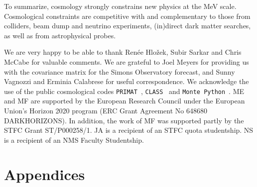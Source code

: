 \documentclass[notitlepage,letterpaper,natbib,aps,prd,onecolumn,amsmath,amsfonts,nofootinbib,preprintnumbers,superscriptaddress,secnumarabic,groupedaddress]{revtex4-1}
\begin{document}
To summarize, cosmology strongly constrains new physics at the MeV scale. Cosmological constraints are competitive with and complementary to those from  colliders, beam dump and neutrino experiments, (in)direct dark matter searches, as well as from astrophysical probes. 

















\begin{acknowledgements}
We are very happy to be able to thank Ren\'ee Hlo\v{z}ek, Subir Sarkar and Chris McCabe for valuable comments. We are grateful to Joel Meyers for providing us with the covariance matrix for the Simons Observatory forecast, and Sunny Vagnozzi and Erminia Calabrese for useful correspondence. We acknowledge the use of the public cosmological codes \texttt{PRIMAT}~\cite{Pitrou:2018cgg}, \texttt{CLASS}~\cite{Blas:2011rf,Lesgourgues:2011re} and \texttt{Monte Python}~\cite{Audren:2012wb,Brinckmann:2018cvx}. ME and MF are supported by the European Research Council under the European Union's Horizon 2020 program (ERC Grant Agreement No 648680 DARKHORIZONS). In addition, the work of MF was supported partly by the STFC Grant ST/P000258/1. JA is a recipient of an STFC quota studentship. NS is a recipient of an NMS Faculty Studentship.
\end{acknowledgements}



\cleardoublepage


%
\setcounter{secnumdepth}{1}


\clearpage
{}
\section{Appendices}
\label{app:App}
\setcounter{secnumdepth}{2}
\renewcommand{\thesubsection}{\Alph{subsection}}
\setcounter{subsection}{0}
\end{document}
